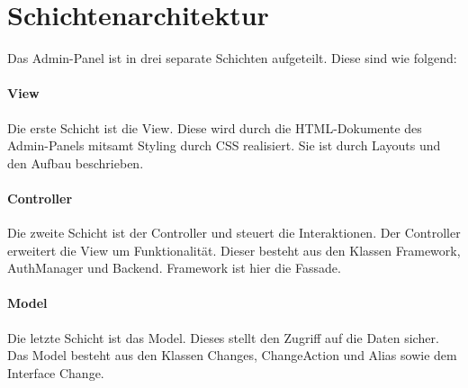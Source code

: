 \section{Schichtenarchitektur}

Das Admin-Panel ist in drei separate Schichten aufgeteilt. Diese sind wie folgend:

\paragraph*{View}
Die erste Schicht ist die View. Diese wird durch die HTML-Dokumente des Admin-Panels mitsamt Styling durch CSS realisiert.
Sie ist durch Layouts und den Aufbau beschrieben.

\paragraph*{Controller}
Die zweite Schicht ist der Controller und steuert die Interaktionen. Der Controller erweitert die View um Funktionalität. 
Dieser besteht aus den Klassen Framework, AuthManager und Backend. Framework ist hier die Fassade.

\paragraph*{Model}
Die letzte Schicht ist das Model. Dieses stellt den Zugriff auf die Daten sicher.
Das Model besteht aus den Klassen Changes, ChangeAction und Alias sowie dem Interface Change.
